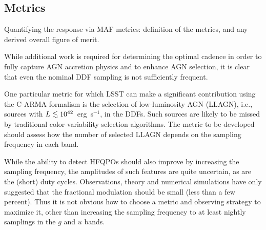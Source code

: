 
\subsection{Metrics}
\label{sec:\secname:metrics}

Quantifying the response via MAF metrics: definition of the metrics,
and any derived overall figure of merit.




While additional work is required for determining the optimal cadence
in order to fully capture AGN accretion physics and to enhance AGN selection,
it is clear that even the nominal DDF sampling is not sufficiently
frequent.

One particular metric for which LSST can make a significant contribution
using the C-ARMA formalism is the selection of low-luminosity AGN (LLAGN),
i.e., sources with $L \lesssim 10^{42}$~erg~s$^{-1}$, in the DDFs. Such
sources are likely to be missed by traditional color-variability selection
algorithms. The metric to be developed should assess how the number of
selected LLAGN depends on the sampling frequency in each band.


While the ability to detect HFQPOs should also improve by increasing the
sampling frequency, the amplitudes of such features are quite uncertain,
as are the (short) duty cycles. Observations, theory and numerical simulations
have only suggested that the fractional modulation should be small (less than
a few percent). Thus it is not obvious how to choose a metric and observing
strategy to maximize it, other than increasing the sampling frequency to
at least nightly samplings in the $g$ and $u$ bands.


